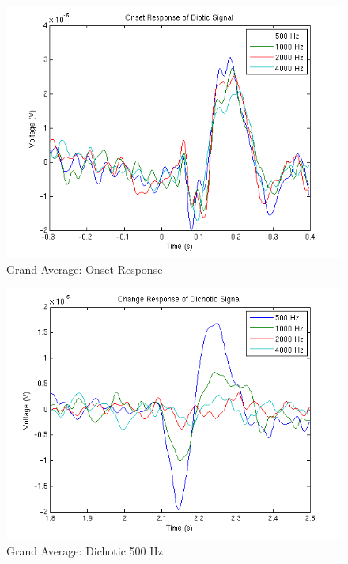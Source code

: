 \documentclass[12pt,journal,compsoc,twocolumn]{IEEEtran}
\begin{document}
\begin{figure}[t]
\centering
\includegraphics[width=3.5 in]{GA_diotic}
\caption{Grand Average: Onset Response}
\label{fig:GA_diotic}
\end{figure}

\begin{figure}[t]
\centering
\includegraphics[width=3.5 in]{GA_dichotic}
\caption{Grand Average: Dichotic 500 Hz}
\label{fig:GA_dichotic}
\end{figure}
\end{document}
